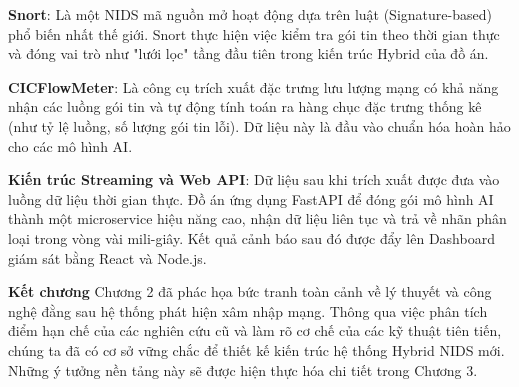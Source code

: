 \documentclass[../DoAn.tex]{subfiles}
\begin{document}
\textbf{Snort}: Là một NIDS mã nguồn mở hoạt động dựa trên luật (Signature-based) phổ biến nhất thế giới. Snort thực hiện việc kiểm tra gói tin theo thời gian thực và đóng vai trò như "lưới lọc" tầng đầu tiên trong kiến trúc Hybrid của đồ án.

\textbf{CICFlowMeter}: Là công cụ trích xuất đặc trưng lưu lượng mạng có khả năng nhận các luồng gói tin và tự động tính toán ra hàng chục đặc trưng thống kê (như tỷ lệ luồng, số lượng gói tin lỗi). Dữ liệu này là đầu vào chuẩn hóa hoàn hảo cho các mô hình AI.

\textbf{Kiến trúc Streaming và Web API}: Dữ liệu sau khi trích xuất được đưa vào luồng dữ liệu thời gian thực. Đồ án ứng dụng FastAPI để đóng gói mô hình AI thành một microservice hiệu năng cao, nhận dữ liệu liên tục và trả về nhãn phân loại trong vòng vài mili-giây. Kết quả cảnh báo sau đó được đẩy lên Dashboard giám sát bằng React và Node.js.

\vspace{1em}
\textbf{Kết chương}
Chương 2 đã phác họa bức tranh toàn cảnh về lý thuyết và công nghệ đằng sau hệ thống phát hiện xâm nhập mạng. Thông qua việc phân tích điểm hạn chế của các nghiên cứu cũ và làm rõ cơ chế của các kỹ thuật tiên tiến, chúng ta đã có cơ sở vững chắc để thiết kế kiến trúc hệ thống Hybrid NIDS mới. Những ý tưởng nền tảng này sẽ được hiện thực hóa chi tiết trong Chương 3.
\end{document}

